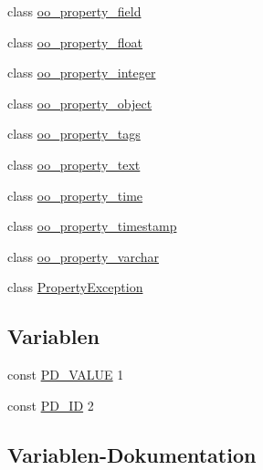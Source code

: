 \begin{DoxyCompactItemize}
\item 
class \hyperlink{classSunhill_1_1Properties_1_1oo__property__field}{oo\+\_\+property\+\_\+field}
\item 
class \hyperlink{classSunhill_1_1Properties_1_1oo__property__float}{oo\+\_\+property\+\_\+float}
\item 
class \hyperlink{classSunhill_1_1Properties_1_1oo__property__integer}{oo\+\_\+property\+\_\+integer}
\item 
class \hyperlink{classSunhill_1_1Properties_1_1oo__property__object}{oo\+\_\+property\+\_\+object}
\item 
class \hyperlink{classSunhill_1_1Properties_1_1oo__property__tags}{oo\+\_\+property\+\_\+tags}
\item 
class \hyperlink{classSunhill_1_1Properties_1_1oo__property__text}{oo\+\_\+property\+\_\+text}
\item 
class \hyperlink{classSunhill_1_1Properties_1_1oo__property__time}{oo\+\_\+property\+\_\+time}
\item 
class \hyperlink{classSunhill_1_1Properties_1_1oo__property__timestamp}{oo\+\_\+property\+\_\+timestamp}
\item 
class \hyperlink{classSunhill_1_1Properties_1_1oo__property__varchar}{oo\+\_\+property\+\_\+varchar}
\item 
class \hyperlink{classSunhill_1_1Properties_1_1PropertyException}{Property\+Exception}
\end{DoxyCompactItemize}
\subsection*{Variablen}
\begin{DoxyCompactItemize}
\item 
const \hyperlink{namespaceSunhill_1_1Properties_a28c3de9e20fd246123a2853f7055117d}{P\+D\+\_\+\+V\+A\+L\+UE} 1
\item 
const \hyperlink{namespaceSunhill_1_1Properties_ac3ed3b43c0e8bebb0244d11456e3d3c6}{P\+D\+\_\+\+ID} 2
\end{DoxyCompactItemize}


\subsection{Variablen-\/\+Dokumentation}
\mbox{\label{namespaceSunhill_1_1Properties_ac3ed3b43c0e8bebb0244d11456e3d3c6}} 
